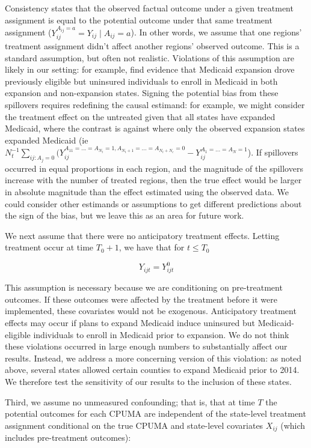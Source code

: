 \documentclass[12pt]{article}
\begin{document}
Consistency states that the observed factual outcome under a given treatment assignment is equal to the potential outcome under that same treatment assignment ($Y_{ij}^{A_{ij} = a} = Y_{ij} \mid A_{ij} = a$). In other words, we assume that one regions' treatment assignment didn't affect another regions' observed outcome. This is a standard assumption, but often not realistic. Violations of this assumption are likely in our setting: for example, \cite{frean2017premium} find evidence that Medicaid expansion drove previously eligible but uninsured individuals to enroll in Medicaid in both expansion and non-expansion states. Signing the potential bias from these spillovers requires redefining the causal estimand: for example, we might consider the treatment effect on the untreated given that all states have expanded Medicaid, where the contrast is against where only the observed expansion states expanded Medicaid (ie $N_t^{-1}\sum_{ij: A_j = 0}(Y_{ij}^{A_{11} = ... = A_{N_t} = 1, A_{N_t + 1} = ... = A_{N_t + N_c} = 0} - Y_{ij}^{A_1 = ... = A_N = 1}$). If spillovers occurred in equal proportions in each region, and the magnitude of the spillovers increase with the number of treated regions, then the true effect would be larger in absolute magnitude than the effect estimated using the observed data. We could consider other estimands or assumptions to get different predictions about the sign of the bias, but we leave this as an area for future work.

We next assume that there were no anticipatory treatment effects. Letting treatment occur at time $T_0 + 1$, we have that for $t \le T_0$

$$
Y_{ijt} = Y_{ijt}^0
$$

This assumption is necessary because we are conditioning on pre-treatment outcomes. If these outcomes were affected by the treatment before it were implemented, these covariates would not be exogenous. Anticipatory treatment effects may occur if plans to expand Medicaid induce uninsured but Medicaid-eligible individuals to enroll in Medicaid prior to expansion. We do not think these violations occurred in large enough numbers to substantially affect our results. Instead, we address a more concerning version of this violation: as noted above, several states allowed certain counties to expand Medicaid prior to 2014. We therefore test the sensitivity of our results to the inclusion of these states.

Third, we assume no unmeasured confounding; that is, that at time $T$ the potential outcomes for each CPUMA are independent of the state-level treatment assignment conditional on the true CPUMA and state-level covariates $X_{ij}$ (which includes pre-treatment outcomes):
\end{document}
